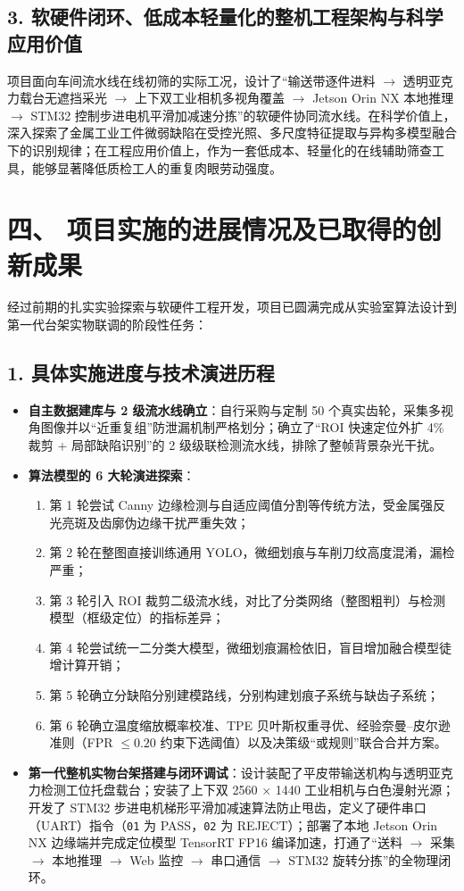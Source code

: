 \subsection*{3. 软硬件闭环、低成本轻量化的整机工程架构与科学应用价值}
项目面向车间流水线在线初筛的实际工况，设计了“输送带逐件进料 $\rightarrow$ 透明亚克力载台无遮挡采光 $\rightarrow$ 上下双工业相机多视角覆盖 $\rightarrow$ Jetson Orin NX 本地推理 $\rightarrow$ STM32 控制步进电机平滑加减速分拣”的软硬件协同流水线。在科学价值上，深入探索了金属工业工件微弱缺陷在受控光照、多尺度特征提取与异构多模型融合下的识别规律；在工程应用价值上，作为一套低成本、轻量化的在线辅助筛查工具，能够显著降低质检工人的重复肉眼劳动强度。

\section*{四、 项目实施的进展情况及已取得的创新成果}

经过前期的扎实实验探索与软硬件工程开发，项目已圆满完成从实验室算法设计到第一代台架实物联调的阶段性任务：

\subsection*{1. 具体实施进度与技术演进历程}
\begin{itemize}
    \item \textbf{自主数据建库与 2 级流水线确立}：自行采购与定制 50 个真实齿轮，采集多视角图像并以“近重复组”防泄漏机制严格划分；确立了“ROI 快速定位外扩 4\% 裁剪 + 局部缺陷识别”的 2 级级联检测流水线，排除了整帧背景杂光干扰。
    \item \textbf{算法模型的 6 大轮演进探索}：
    \begin{enumerate}
        \item 第 1 轮尝试 Canny 边缘检测与自适应阈值分割等传统方法，受金属强反光亮斑及齿廓伪边缘干扰严重失效；
        \item 第 2 轮在整图直接训练通用 YOLO，微细划痕与车削刀纹高度混淆，漏检严重；
        \item 第 3 轮引入 ROI 裁剪二级流水线，对比了分类网络（整图粗判）与检测模型（框级定位）的指标差异；
        \item 第 4 轮尝试统一二分类大模型，微细划痕漏检依旧，盲目增加融合模型徒增计算开销；
        \item 第 5 轮确立分缺陷分别建模路线，分别构建划痕子系统与缺齿子系统；
        \item 第 6 轮确立温度缩放概率校准、TPE 贝叶斯权重寻优、经验奈曼–皮尔逊准则（FPR $\le 0.20$ 约束下选阈值）以及决策级“或规则”联合合并方案。
    \end{enumerate}
    \item \textbf{第一代整机实物台架搭建与闭环调试}：设计装配了平皮带输送机构与透明亚克力检测工位托盘载台；安装了上下双 2560 $\times$ 1440 工业相机与白色漫射光源；开发了 STM32 步进电机梯形平滑加减速算法防止甩齿，定义了硬件串口（UART）指令（\texttt{01} 为 PASS，\texttt{02} 为 REJECT）；部署了本地 Jetson Orin NX 边缘端并完成定位模型 TensorRT FP16 编译加速，打通了“送料 $\rightarrow$ 采集 $\rightarrow$ 本地推理 $\rightarrow$ Web 监控 $\rightarrow$ 串口通信 $\rightarrow$ STM32 旋转分拣”的全物理闭环。
\end{itemize}

